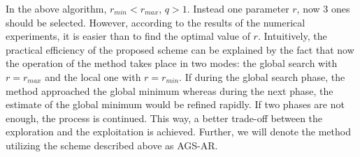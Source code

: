 \documentclass[runningheads]{llncs}
\begin{document}
In the above algorithm, $r_{min} < r_{max}$, $q > 1$. Instead one parameter $r$, now
3 ones should be selected. However, according to the results of the numerical experiments, it is easier
than to find the optimal value of $r$.
Intuitively, the practical efficiency of the proposed scheme can be explained by the fact that now the
operation of the method takes place in two modes: the global search with $r=r_{max}$ and the local
one with $r=r_{min}$. If during the global search phase, the method approached the global minimum
whereas during the next phase, the estimate of the global minimum  would be refined rapidly.
If two phases are not enough, the process is continued. This way, a better trade-off
between the exploration and the exploitation is achieved.
Further, we will denote the method utilizing the scheme described above as AGS-AR.
\end{document}
